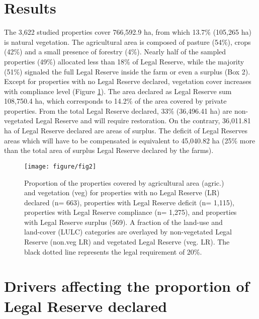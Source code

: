 \documentclass[
	12pt,				%
	oneside,			%
	a4paper,			%
	chapter=TITLE,		%
	section=TITLE,		%
	brazil,			%
	english				%
	]{abntex2}
\begin{document}
\hypertarget{results}{%
\section{Results}\label{results}}

The 3,622 studied properties cover 766,592.9 ha, from which 13.7\% (105,265 ha) is natural vegetation. The agricultural area is composed of pasture (54\%), crops (42\%) and a small presence of forestry (4\%). Nearly half of the sampled properties (49\%) allocated less than 18\% of Legal Reserve, while the majority (51\%) signaled the full Legal Reserve inside the farm or even a surplus (Box 2). Except for properties with no Legal Reserve declared, vegetation cover increases with compliance level (Figure \ref{fig:Figure2}). The area declared as Legal Reserve sum 108,750.4 ha, which corresponds to 14.2\% of the area covered by private properties. From the total Legal Reserve declared, 33\% (36,496.41 ha) are non-vegetated Legal Reserve and will require restoration. On the contrary, 36,011.81 ha of Legal Reserve declared are areas of surplus. The deficit of Legal Reserves areas which will have to be compensated is equivalent to 45,040.82 ha (25\% more than the total area of surplus Legal Reserve declared by the farms).
\begin{figure}[H]

{\centering \texttt{[image: figure/fig2]} 

}

\caption{Proportion of the properties covered by agricultural area (agric.) and vegetation (veg) for properties with no Legal Reserve (LR) declared (n= 663), properties with Legal Reserve deficit (n= 1,115), properties with Legal Reserve compliance (n= 1,275), and properties with Legal Reserve surplus (569). A fraction of the land-use and land-cover (LULC) categories are overlayed by non-vegetated Legal Reserve (non.veg LR) and vegetated Legal Reserve (veg. LR). The black dotted line represents the legal requirement of 20\%.}\label{fig:Figure2}
\end{figure}
\hypertarget{drivers-affecting-the-proportion-of-legal-reserve-declared}{%
\section{Drivers affecting the proportion of Legal Reserve declared}\label{drivers-affecting-the-proportion-of-legal-reserve-declared}}
\end{document}
